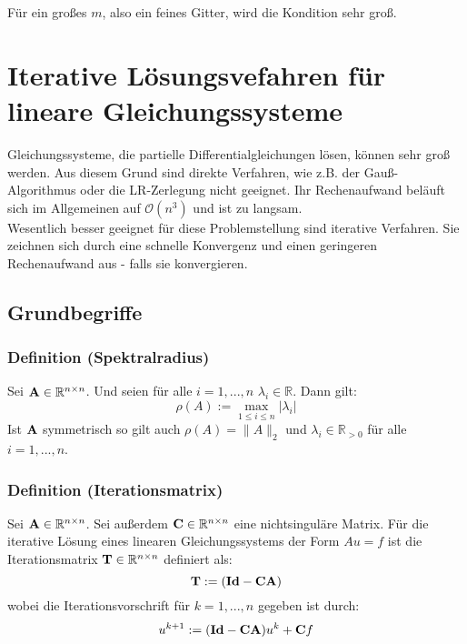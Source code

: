 Für ein großes $m$, also ein feines Gitter, wird die Kondition sehr groß.

\chapter{Iterative Lösungsvefahren für lineare Gleichungssysteme}\label{c.IterativeVerfahren}

Gleichungssysteme, die partielle Differentialgleichungen lösen, können sehr groß werden. Aus diesem Grund sind direkte Verfahren, wie z.B. der Gauß-Algorithmus oder die LR-Zerlegung nicht geeignet. Ihr Rechenaufwand beläuft sich im Allgemeinen auf $\mathcal{O}(n^{3})$ und ist zu langsam.\\
Wesentlich besser geeignet für diese Problemstellung sind iterative Verfahren. Sie zeichnen sich durch eine schnelle Konvergenz und einen geringeren Rechenaufwand aus - falls sie konvergieren.

\section{Grundbegriffe}\label{s.Grundbegriffe}

\subsection{Definition (Spektralradius)}\label{s.Spektralradius}

Sei ${\textbf{A}} \in \mathbb{R}^{n \times n}$. Und seien für alle $i=1,...,n$ $\lambda_{i} \in \mathbb{R}$. Dann gilt:
\begin{equation}
\rho(A) := \max_{1 \le i \le n} | \lambda_{i} |
\end{equation}
Ist ${\textbf{A}}$ symmetrisch so gilt auch $\rho(A) = \| A \|_{2}$ und $\lambda_{i} \in \mathbb{R}_{>0}$ für alle $i=1,...,n$.

\subsection{Definition (Iterationsmatrix)}\label{ss.Iterationsmatrix}

Sei ${\textbf{A}} \in \mathbb{R}^{n \times n}$. Sei außerdem ${\textbf{C}} \in \mathbb{R}^{n \times n}$ eine nichtsinguläre Matrix. Für die iterative Lösung eines linearen Gleichungssystems der Form $Au = f$ ist die Iterationsmatrix ${\textbf{T}} \in \mathbb{R}^{n \times n}$ definiert als:
\begin{equation}
{\textbf{T}} := ({\textbf{Id}} - {\textbf{C}} {\textbf{A}})
\end{equation}
wobei die Iterationsvorschrift für $k=1,...,n$ gegeben ist durch:
\begin{equation}
u^{k+1} := ({\textbf{Id}} - {\textbf{C}} {\textbf{A}})u^{k} + {\textbf{C}} f\label{eq.Iteratives Verfahren}
\end{equation}

